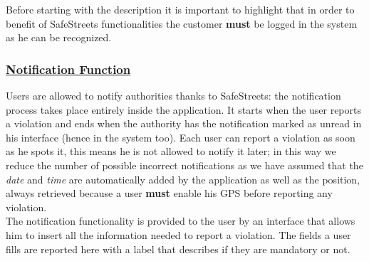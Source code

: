 	Before starting with the description it is important to highlight that in order to benefit of SafeStreets functionalities the customer \textbf{must} be logged in the system as he can be recognized.
	
	\subsubsection[Notification Function]{\hyperlink{toc}{Notification Function}}
		\label{sec:notificationFunction}
		Users are allowed to notify authorities thanks to SafeStreets: the notification process takes place entirely inside the application. It starts when the user reports a violation and ends when the authority has the notification marked as unread in his interface (hence in the system too). Each user can report a violation as soon as he spots it, this means he is not allowed to notify it later; in this way we reduce the number of possible incorrect notifications as we have assumed that the \emph{date} and \emph{time} are automatically added by the application as well as the position, always retrieved because a user \textbf{must} enable his GPS before reporting any violation.\\
		
		The notification functionality is provided to the user by an interface that allows him to insert all the information needed to report a violation. The fields a user fills are reported here with a label that describes if they are mandatory or not.
		
